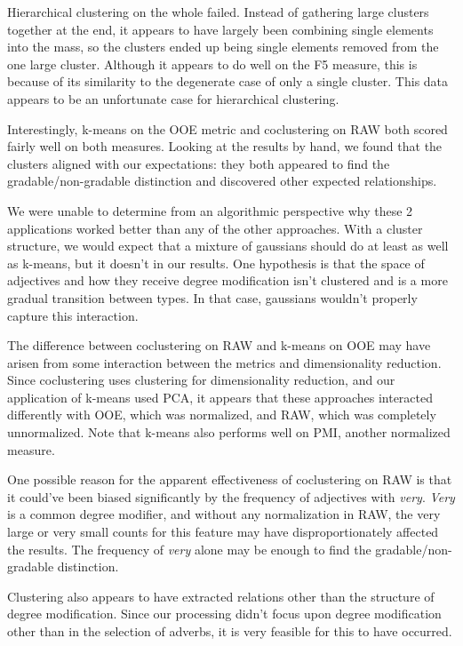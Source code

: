 \documentclass[11pt]{amsart}
\begin{document}
Hierarchical clustering on the whole failed. Instead of gathering large clusters together at the end, it appears to have largely been combining single elements into the mass, so the clusters ended up being single elements removed from the one large cluster. Although it appears to do well on the F5 measure, this is because of its similarity to the degenerate case of only a single cluster. This data appears to be an unfortunate case for hierarchical clustering. 

Interestingly, k-means on the OOE metric and coclustering on RAW both scored fairly well on both measures. Looking at the results by hand, we found that the clusters aligned with our expectations: they both appeared to find the gradable/non-gradable distinction and discovered other expected relationships.

We were unable to determine from an algorithmic perspective why these 2 applications worked better than any of the other approaches. With a cluster structure, we would expect that a mixture of gaussians should do at least as well as k-means, but it doesn't in our results. One hypothesis is that the space of adjectives and how they receive degree modification isn't clustered and is a more gradual transition between types. In that case, gaussians wouldn't properly capture this interaction.

The difference between coclustering on RAW and k-means on OOE may have arisen from some interaction between the metrics and dimensionality reduction. Since coclustering uses clustering for dimensionality reduction, and our application of k-means used PCA, it appears that these approaches interacted differently with OOE, which was normalized, and RAW, which was completely unnormalized. Note that k-means also performs well on PMI, another normalized measure.

One possible reason for the apparent effectiveness of coclustering on RAW is that it could've been biased significantly by the frequency of adjectives with \textit{very}. \textit{Very} is a common degree modifier, and without any normalization in RAW, the very large or very small counts for this feature may have disproportionately affected the results. The frequency of \textit{very} alone may be enough to find the gradable/non-gradable distinction.

Clustering also appears to have extracted relations other than the structure of degree modification. Since our processing didn't focus upon degree modification other than in the selection of adverbs, it is very feasible for this to have occurred.
\end{document}
